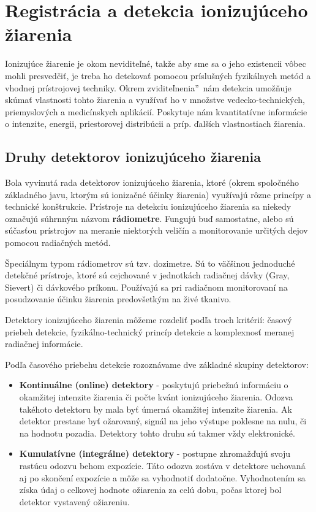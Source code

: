 \documentclass[../../main.tex]{subfiles}
\begin{document}
\chapter{Registrácia a detekcia ionizujúceho žiarenia}

Ionizujúce žiarenie je okom neviditeľné, takže aby sme sa o jeho existencii vôbec mohli presvedčiť, je treba ho detekovať pomocou príslušných fyzikálnych metód a vhodnej prístrojovej techniky. Okrem \quotedblbase zviditeľnenia\textquotedblright ~nám detekcia umožňuje skúmať vlastnosti tohto žiarenia a využívať ho v množstve vedecko-technických, priemyslových a medicínskych aplikácií. Poskytuje nám kvantitatívne informácie o intenzite, energii, priestorovej distribúcii a príp. ďalších vlastnostiach žiarenia.

\section{Druhy detektorov ionizujúceho žiarenia}

Bola vyvinutá rada detektorov ionizujúceho žiarenia, ktoré (okrem spoločného základného javu, ktorým sú ionizačné účinky žiarenia) využívajú rôzne princípy a technické konštrukcie. Prístroje na detekciu ionizujúceho žiarenia sa niekedy označujú súhrnným názvom \textbf{rádiometre}. Fungujú buď samostatne, alebo sú súčasťou prístrojov na meranie niektorých veličín a monitorovanie určitých dejov pomocou radiačných metód.

Špeciálnym typom rádiometrov sú tzv. dozimetre. Sú to väčšinou jednoduché detekčné prístroje, ktoré sú cejchované v jednotkách radiačnej dávky (Gray, Sievert) či dávkového príkonu. Používajú sa pri radiačnom monitorovaní na posudzovanie účinku žiarenia predovšetkým na živé tkanivo.  

Detektory ionizujúceho žiarenia môžeme rozdeliť podľa troch kritérií: časový priebeh detekcie, fyzikálno-technický princíp detekcie a komplexnosť meranej radiačnej informácie.

Podľa časového priebehu detekcie rozoznávame dve základné skupiny detektorov:
\begin{itemize}
\item \textbf{Kontinuálne (online) detektory} - poskytujú priebežnú informáciu o okamžitej intenzite žiarenia či počte kvánt ionizujúceho žiarenia. Odozva takéhoto detektoru by mala byť úmerná okamžitej intenzite žiarenia. Ak detektor prestane byť ožarovaný, signál na jeho výstupe poklesne na nulu, či na hodnotu pozadia. Detektory tohto druhu sú takmer vždy elektronické.

\item \textbf{Kumulatívne (integrálne) detektory} - postupne zhromažďujú svoju rastúcu odozvu behom expozície. Táto odozva zostáva v detektore uchovaná aj po skončení expozície a môže sa vyhodnotiť dodatočne. Vyhodnotením sa získa údaj o celkovej hodnote ožiarenia za celú dobu, počas ktorej bol detektor vystavený ožiareniu.
\end{itemize}
\end{document}
